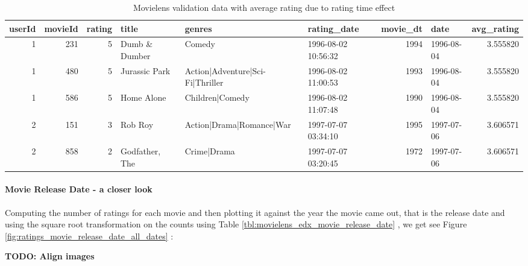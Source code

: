 \documentclass[
]{article}
\begin{document}
\begin{table}[H]

\caption{\label{tab:rd_3}Movielens validation data with average rating due to rating time effect\label{tbl:movielens_validation_avg_rating_time_effect}}
\centering
\fontsize{6}{8}\selectfont
\begin{tabular}[t]{rrrlllrlr}
\toprule
userId & movieId & rating & title & genres & rating\_date & movie\_dt & date & avg\_rating\\
\midrule
1 & 231 & 5 & Dumb \& Dumber & Comedy & 1996-08-02 10:56:32 & 1994 & 1996-08-04 & 3.555820\\
1 & 480 & 5 & Jurassic Park & Action|Adventure|Sci-Fi|Thriller & 1996-08-02 11:00:53 & 1993 & 1996-08-04 & 3.555820\\
1 & 586 & 5 & Home Alone & Children|Comedy & 1996-08-02 11:07:48 & 1990 & 1996-08-04 & 3.555820\\
2 & 151 & 3 & Rob Roy & Action|Drama|Romance|War & 1997-07-07 03:34:10 & 1995 & 1997-07-06 & 3.606571\\
2 & 858 & 2 & Godfather, The & Crime|Drama & 1997-07-07 03:20:45 & 1972 & 1997-07-06 & 3.606571\\
\bottomrule
\end{tabular}
\end{table}

\newpage

\hypertarget{movie-release-date---a-closer-look}{%
\paragraph{Movie Release Date - a closer
look}\label{movie-release-date---a-closer-look}}

Computing the number of ratings for each movie and then plotting it
against the year the movie came out, that is the release date and using
the square root transformation on the counts using Table
\ref{tbl:movielens_edx_movie_release_date} , we get see Figure
\ref{fig:ratings_movie_release_date_all_dates} :

\textbf{TODO: Align images}
\end{document}

